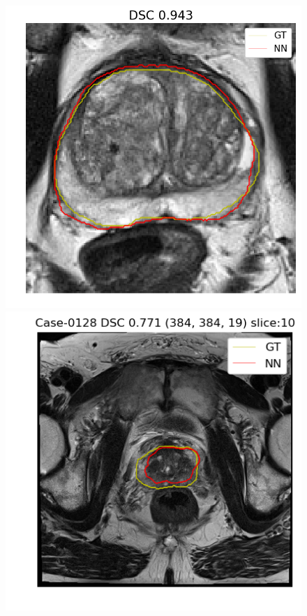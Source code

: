 \begin{figure}[h]
    \includegraphics[totalheight=.2\textheight]{imgs/results/Prostate_Px_Challenge__P_yes_ROI_MAX_Case-0337.png}
    \vspace{10mm}
    \includegraphics[totalheight=.2\textheight]{imgs/results/Prostate_Px_Challenge__P_yes_Original_MIN_Case-0128.png}

\end{figure}
